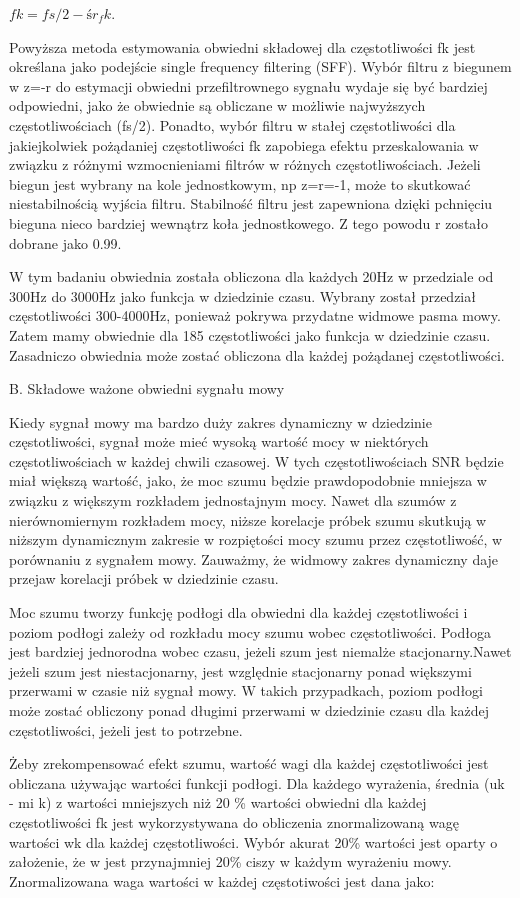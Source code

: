 \documentclass[eng,printmode]{mgr}
\begin{document}
 $fk = fs/2 - śr_fk.$
 
 
 Powyższa metoda estymowania obwiedni składowej dla częstotliwości fk jest określana jako podejście single frequency filtering (SFF). Wybór filtru z biegunem w z=-r do estymacji obwiedni przefiltrownego sygnału wydaje się być bardziej odpowiedni, jako że obwiednie są obliczane w możliwie najwyższych częstotliwościach (fs/2). Ponadto, wybór filtru w stałej częstotliwości dla jakiejkolwiek pożądaniej częstotliwości fk zapobiega efektu przeskalowania w związku z różnymi wzmocnieniami filtrów w różnych częstotliwościach. Jeżeli biegun jest wybrany na kole jednostkowym, np z=r=-1, może to skutkować niestabilnością wyjścia filtru. Stabilność filtru jest zapewniona dzięki pchnięciu bieguna nieco bardziej wewnątrz koła jednostkowego. Z tego powodu r zostało dobrane jako 0.99.
 
 W tym badaniu obwiednia została obliczona dla każdych 20Hz w przedziale od 300Hz do 3000Hz jako funkcja w dziedzinie czasu. Wybrany został przedział częstotliwości 300-4000Hz, ponieważ pokrywa przydatne widmowe pasma mowy. Zatem mamy obwiednie dla 185 częstotliwości jako funkcja w dziedzinie czasu. Zasadniczo obwiednia może zostać obliczona dla każdej pożądanej częstotliwości.
 
 
 B. Składowe ważone obwiedni sygnału mowy
 
 Kiedy sygnał mowy ma bardzo duży zakres dynamiczny w dziedzinie częstotliwości, sygnał może mieć wysoką wartość mocy w niektórych częstotliwościach w każdej chwili czasowej. W tych częstotliwościach SNR będzie miał większą wartość, jako, że moc szumu będzie prawdopodobnie mniejsza w związku z większym rozkładem jednostajnym mocy. Nawet dla szumów z nierównomiernym rozkładem mocy, niższe korelacje próbek szumu skutkują w niższym dynamicznym zakresie w rozpiętości mocy szumu przez częstotliwość, w porównaniu z sygnałem mowy. Zauważmy, że widmowy zakres dynamiczny daje przejaw korelacji próbek w dziedzinie czasu. 
 
 Moc szumu tworzy funkcję podłogi dla obwiedni dla każdej częstotliwości i poziom podłogi zależy od rozkładu mocy szumu wobec częstotliwości. Podłoga jest bardziej jednorodna wobec czasu, jeżeli szum jest niemalże stacjonarny.Nawet jeżeli szum jest niestacjonarny, jest względnie stacjonarny ponad większymi przerwami w czasie niż sygnał mowy. W takich przypadkach, poziom podłogi może zostać obliczony ponad długimi przerwami w dziedzinie czasu dla każdej częstotliwości, jeżeli jest to potrzebne.
 
 Żeby zrekompensować efekt szumu, wartość wagi dla każdej częstotliwości jest obliczana używając wartości funkcji podłogi. Dla każdego wyrażenia, średnia (uk - mi k) z wartości mniejszych niż 20 \% wartości obwiedni dla każdej częstotliwości fk jest wykorzystywana do obliczenia znormalizowaną wagę wartości wk dla każdej częstotliwości. Wybór akurat 20\% wartości jest oparty o założenie, że w jest przynajmniej 20\% ciszy w każdym wyrażeniu mowy. Znormalizowana waga wartości w każdej częstotiwości jest dana jako:
 
\end{document}
